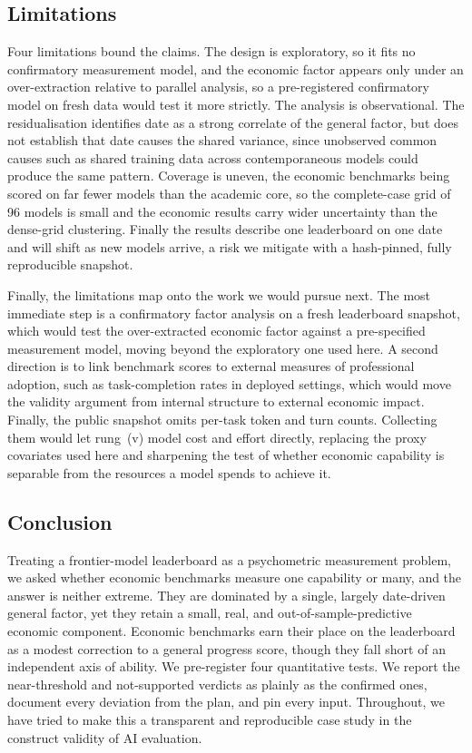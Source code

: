 \subsection{Limitations}\label{sec:limitations}
Four limitations bound the claims. The design is exploratory, so it fits no confirmatory measurement model, and the economic
factor appears only under an over-extraction relative to parallel analysis, so a pre-registered
confirmatory model on fresh data would test it more strictly. The analysis is observational. The residualisation identifies date as a strong correlate of the general factor, but does not establish that date causes the shared variance, since unobserved common causes such as shared training data across
contemporaneous models could produce the same pattern. Coverage is uneven, the economic benchmarks being
scored on far fewer models than the academic core, so the complete-case grid of 96 models is small and
the economic results carry wider uncertainty than the dense-grid clustering. Finally the results
describe one leaderboard on one date and will shift as new models arrive, a risk we mitigate with a
hash-pinned, fully reproducible snapshot.

Finally, the limitations map onto the work we would pursue next. The most immediate step is a
confirmatory factor analysis on a fresh leaderboard snapshot, which would test the over-extracted
economic factor against a pre-specified measurement model, moving beyond the exploratory one used here. A second
direction is to link benchmark scores to external measures of professional adoption, such as
task-completion rates in deployed settings, which would move the validity argument from internal
structure to external economic impact. Finally, the public snapshot omits per-task token and turn counts. Collecting them would let rung~(v) model cost and effort directly, replacing the proxy covariates used here and sharpening the test of whether economic capability is separable from the resources a model
spends to achieve it.

\subsection{Conclusion}\label{sec:conclusion}
Treating a frontier-model leaderboard as a psychometric measurement problem, we asked whether economic
benchmarks measure one capability or many, and the answer is neither extreme. They are dominated by a
single, largely date-driven general factor, yet they retain a small, real, and out-of-sample-predictive
economic component. Economic benchmarks earn their place on the leaderboard as a modest correction to a
general progress score, though they fall short of an independent axis of ability. We pre-register four quantitative tests. We report the near-threshold and not-supported verdicts as plainly as the confirmed ones, document every deviation from the plan, and pin every input. Throughout, we have tried to make this a
transparent and reproducible case study in the construct validity of AI evaluation.